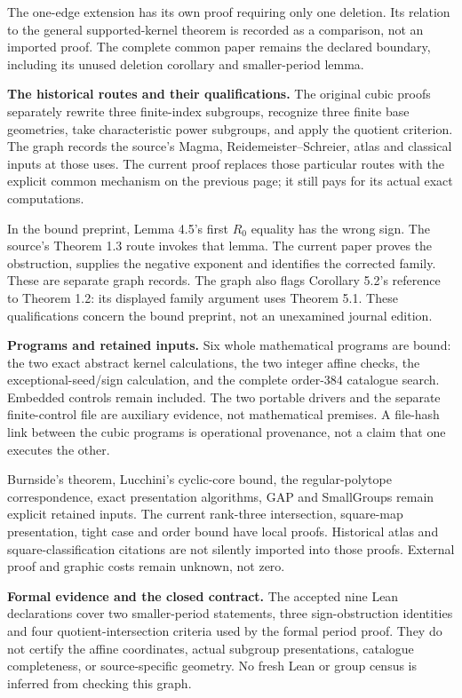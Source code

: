\documentclass[11pt]{article}
\begin{document}
The one-edge extension has its own proof requiring only one deletion. Its
relation to the general supported-kernel theorem is recorded as a comparison,
not an imported proof. The complete common paper remains the declared
boundary, including its unused deletion corollary and smaller-period lemma.

\newpage
\textbf{The historical routes and their qualifications.}
The original cubic proofs separately rewrite three finite-index subgroups,
recognize three finite base geometries, take characteristic power subgroups,
and apply the quotient criterion. The graph records the source's Magma,
Reidemeister--Schreier, atlas and classical inputs at those uses. The current
proof replaces those particular routes with the explicit common mechanism
on the previous page; it still pays for its actual exact computations.

In the bound preprint, Lemma 4.5's first $R_0$ equality has the wrong sign.
The source's Theorem 1.3 route invokes that lemma. The current paper proves
the obstruction, supplies the negative exponent and identifies the corrected
family. These are separate graph records. The graph also flags Corollary
5.2's reference to Theorem 1.2: its displayed family argument uses Theorem
5.1. These qualifications concern the bound preprint, not an unexamined
journal edition.

\textbf{Programs and retained inputs.}
Six whole mathematical programs are bound: the two exact abstract kernel
calculations, the two integer affine checks, the exceptional-seed/sign
calculation, and the complete order-384 catalogue search. Embedded controls
remain included. The two portable drivers and the separate finite-control
file are auxiliary evidence, not mathematical premises. A file-hash link
between the cubic programs is operational provenance, not a claim that one
executes the other.

Burnside's theorem, Lucchini's cyclic-core bound, the regular-polytope
correspondence, exact presentation algorithms, GAP and SmallGroups remain
explicit retained inputs. The current rank-three intersection, square-map
presentation, tight case and order bound have local proofs. Historical atlas
and square-classification citations are not silently imported into those
proofs. External proof and graphic costs remain unknown, not zero.

\textbf{Formal evidence and the closed contract.}
The accepted nine Lean declarations cover two smaller-period statements,
three sign-obstruction identities and four quotient-intersection criteria
used by the formal period proof. They do not certify the affine coordinates,
actual subgroup presentations, catalogue completeness, or source-specific
geometry. No fresh Lean or group census is inferred from checking this graph.
\end{document}
